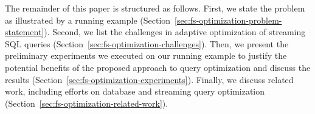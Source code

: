 The remainder of this paper is structured as follows. First, we state the problem as illustrated by a running example (Section~\ref{sec:fs-optimization-problem-statement}). 
Second, we list the challenges in adaptive optimization of streaming SQL queries (Section~\ref{sec:fs-optimization-challenges}). 
Then, we present the preliminary experiments we executed on our running example to justify the potential benefits of the proposed approach to query optimization and discuss the results (Section~\ref{sec:fs-optimization-experiments}). 
Finally, we discuss related work, including efforts on database and streaming query optimization (Section~\ref{sec:fs-optimization-related-work}).     
